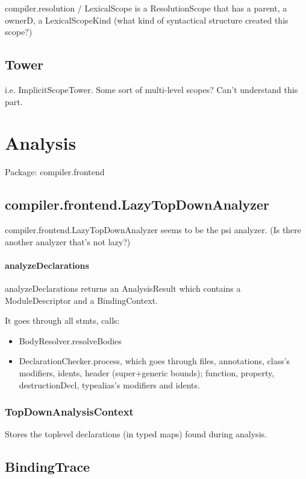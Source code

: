 \documentclass{article}
\begin{document}
compiler.resolution / LexicalScope is a ResolutionScope that has a parent, a ownerD, a LexicalScopeKind (what kind of syntactical structure created this scope?)

\subsection{Tower}

i.e. ImplicitScopeTower. Some sort of multi-level scopes? Can't understand this part.

\section{Analysis}

Package: compiler.frontend

\subsection{compiler.frontend.LazyTopDownAnalyzer}

compiler.frontend.LazyTopDownAnalyzer seems to be the psi analyzer. (Is there another analyzer that's not lazy?)

\paragraph{analyzeDeclarations}

analyzeDeclarations returns an AnalysisResult which contains a ModuleDescriptor and a BindingContext.

It goes through all stmts, calls:
\begin{itemize}
    \item BodyResolver.resolveBodies
    \item DeclarationChecker.process, which goes through files, annotations, class's modifiers, idents, header (super+generic bounds); function, property, destructionDecl, typealias's modifiers and idents.
\end{itemize}

\subsubsection{TopDownAnalysisContext}

Stores the toplevel declarations (in typed maps) found during analysis.

\subsection{BindingTrace}
\end{document}
